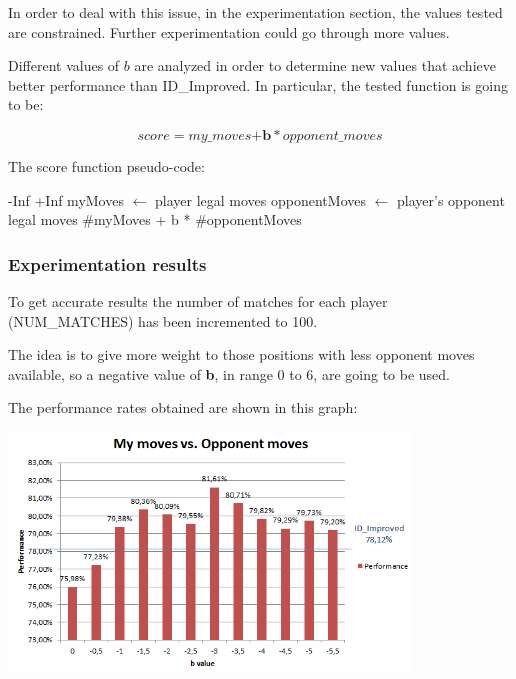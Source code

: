 \documentclass[10pt, a4paper,english]{article}
\begin{document}
In order to deal with this issue, in the experimentation section, the values tested are constrained. Further experimentation could go through more values.

Different values of $b$ are analyzed in order to determine new values that achieve better performance than ID\_Improved. In particular, the tested function is going to be:

\[
	score = my\_moves \textbf{+} \textbf{b}*opponent\_moves
\]

The score function pseudo-code:\\

\begin{algorithmic}
    \State\Return -Inf
\EndIf    
{}
   \State \Return +Inf
\Else
	\State myMoves $\leftarrow$ player legal moves
    \State opponentMoves $\leftarrow$ player's opponent legal moves
    \State\Return \#myMoves + b * \#opponentMoves
\EndIf
\EndFunction
\end{algorithmic}

\subsubsection{Experimentation results}

To get accurate results the number of matches for each player (NUM\_MATCHES) has been incremented to 100.   

The idea is to give more weight to those positions with less opponent moves available, so a negative value of \textbf{b}, in range 0 to 6, are going to be used.

The performance rates obtained are shown in this graph:

\begin{center}
\includegraphics[width=0.8\textwidth]{mymovesopponent.png}\\
\end{center}
\end{document}
